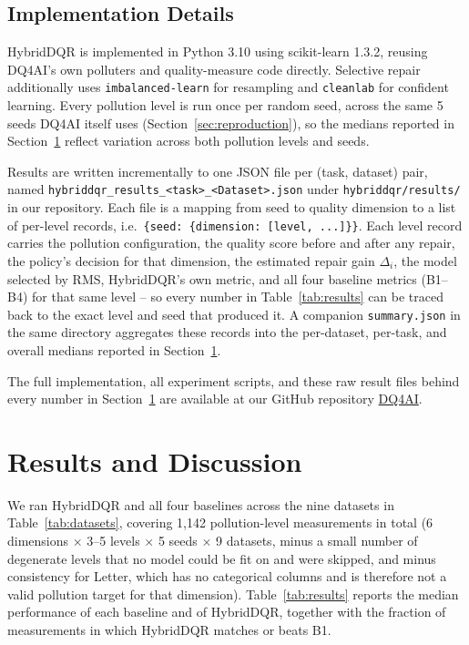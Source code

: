 \documentclass[runningheads]{llncs}
\begin{document}
\subsection{Implementation Details}

HybridDQR is implemented in Python 3.10 using scikit-learn 1.3.2,
reusing DQ4AI's own polluters and quality-measure code directly.
Selective repair additionally uses \texttt{imbalanced-learn} for
resampling and \texttt{cleanlab} for confident learning. Every
pollution level is run once per random seed, across the same 5
seeds DQ4AI itself uses (Section~\ref{sec:reproduction}), so the
medians reported in Section~\ref{sec:results} reflect variation
across both pollution levels and seeds.

Results are written incrementally to one JSON file per (task,
dataset) pair, named \texttt{hybriddqr\_results\_<task>\_<Dataset>.json}
under \texttt{hybriddqr/results/} in our repository. Each file is a
mapping from seed to quality dimension to a list of per-level
records, i.e.\ \texttt{\{seed: \{dimension: [level, ...]\}\}}. Each
level record carries the pollution configuration, the quality score
before and after any repair, the policy's decision for that
dimension, the estimated repair gain $\Delta_i$, the model selected
by RMS, HybridDQR's own metric, and all four baseline metrics
(B1--B4) for that same level -- so every number in
Table~\ref{tab:results} can be traced back to the exact level and
seed that produced it. A companion \texttt{summary.json} in the same
directory aggregates these records into the per-dataset, per-task,
and overall medians reported in Section~\ref{sec:results}.

The full implementation, all experiment scripts, and these raw
result files behind every number in Section~\ref{sec:results} are
available at our GitHub repository
\href{https://github.com/Quangdt21127150/DQ4AI.git}{DQ4AI}.

\section{Results and Discussion}
\label{sec:results}

We ran HybridDQR and all four baselines across the nine datasets
in Table~\ref{tab:datasets}, covering 1,142 pollution-level
measurements in total (6 dimensions $\times$ 3--5 levels $\times$
5 seeds $\times$ 9 datasets, minus a small number of degenerate
levels that no model could be fit on and were skipped, and minus
consistency for Letter, which has no categorical columns and is
therefore not a valid pollution target for that dimension).
Table~\ref{tab:results} reports the median performance of each
baseline and of HybridDQR, together with the fraction of
measurements in which HybridDQR matches or beats B1.
\end{document}
